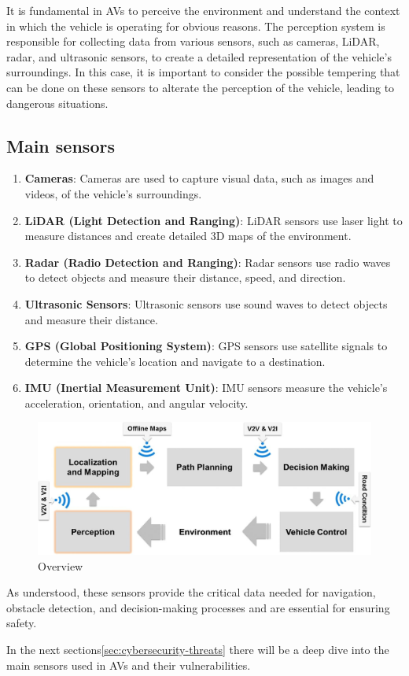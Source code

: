 It is fundamental in AVs to perceive the environment and understand the context in which the vehicle is operating for obvious reasons.
The perception system is responsible for collecting data from various sensors, such as cameras, LiDAR, radar, and ultrasonic sensors, to create a detailed representation of the vehicle's surroundings.
In this case, it is important to consider the possible tempering that can be done on these sensors to alterate the perception of the vehicle, leading to dangerous situations\cite{kim2020cybersecurity, sec-sensors-2023, metro2020analysis, sensors}.

\subsection{Main sensors}\label{subsec:main-sensors}

\begin{enumerate}
    \item \textbf{Cameras}: Cameras are used to capture visual data, such as images and videos, of the vehicle's surroundings.
    \item \textbf{LiDAR (Light Detection and Ranging)}: LiDAR sensors use laser light to measure distances and create detailed 3D maps of the environment.
    \item \textbf{Radar (Radio Detection and Ranging)}: Radar sensors use radio waves to detect objects and measure their distance, speed, and direction.
    \item \textbf{Ultrasonic Sensors}: Ultrasonic sensors use sound waves to detect objects and measure their distance.
    \item \textbf{GPS (Global Positioning System)}: GPS sensors use satellite signals to determine the vehicle's location and navigate to a destination.
    \item \textbf{IMU (Inertial Measurement Unit)}: IMU sensors measure the vehicle's acceleration, orientation, and angular velocity.
\end{enumerate}

\begin{figure}[!htb]
    \centering
    \includegraphics[width=0.7\linewidth]{figures/perception}
    \caption{Overview}
    \label{fig:sensors}
\end{figure}

As understood, these sensors provide the critical data needed for navigation, obstacle
detection, and decision-making processes and are essential for ensuring safety\cite{unknown2020connected,cybersec}.

In the next sections\ref{sec:cybersecurity-threats} there will be a deep dive into the main sensors used in AVs and their vulnerabilities.
